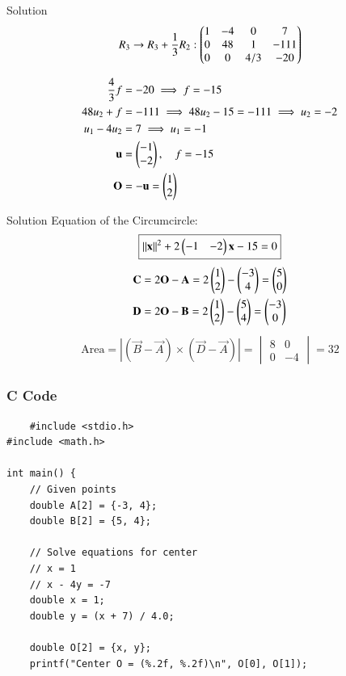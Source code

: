 \documentclass{beamer}
\begin{document}
\begin{frame}{Solution}
\begin{align}
R_3 \to R_3 + \frac{1}{3} R_2 :
 \begin{pmatrix}
1 & -4 & 0 & 7 \\
0 & 48 & 1 & -111 \\
0 & 0 & 4/3 & -20
\end{pmatrix}
\end{align}

\begin{align}
\frac{4}{3} f &= -20 \implies f = -15 \\
48 u_2 + f &= -111 \implies 48 u_2 - 15 = -111 \implies u_2 = -2 \\
u_1 - 4 u_2 &= 7 \implies  u_1 = -1\\
\mathbf{u} &= \begin{pmatrix}-1 \\ -2\end{pmatrix}, \quad f = -15\\
\mathbf{O} &= -\mathbf{u} = \begin{pmatrix}1 \\ 2\end{pmatrix}
\end{align}
\end{frame}
\begin{frame}{Solution}
Equation of the Circumcircle:
\begin{align}
\boxed{||\mathbf{x}||^2+2\begin{pmatrix}-1 & -2\end{pmatrix}\mathbf{x}-15=0}
\end{align}
\begin{align}
\mathbf{C} &= 2\mathbf{O} - \mathbf{A} = 2\begin{pmatrix}1 \\ 2\end{pmatrix} - \begin{pmatrix}-3 \\ 4\end{pmatrix} = \begin{pmatrix}5 \\ 0\end{pmatrix} \\
\mathbf{D} &= 2\mathbf{O} - \mathbf{B} = 2\begin{pmatrix}1 \\ 2\end{pmatrix} - \begin{pmatrix}5 \\ 4\end{pmatrix} = \begin{pmatrix}-3 \\ 0\end{pmatrix}
\end{align}
\begin{align}
\text{Area}=|(\vec{B} - \vec{A}) \times (\vec{D} -\vec{A})| =
\begin{vmatrix} 8 & 0 \\ 0 & -4 \end{vmatrix} = 32
\end{align}

\end{frame}
\begin{frame}[fragile]
\frametitle{C Code}
\begin{lstlisting}
    #include <stdio.h>
#include <math.h>

int main() {
    // Given points
    double A[2] = {-3, 4};
    double B[2] = {5, 4};

    // Solve equations for center
    // x = 1
    // x - 4y = -7
    double x = 1;
    double y = (x + 7) / 4.0;

    double O[2] = {x, y};
    printf("Center O = (%.2f, %.2f)\n", O[0], O[1]);
\end{lstlisting}
\end{frame}
\end{document}
